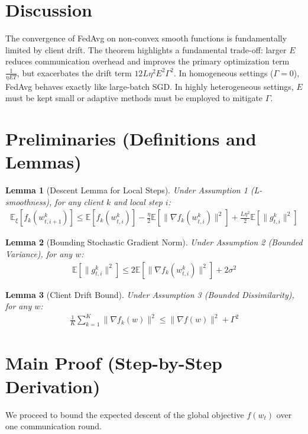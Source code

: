 \documentclass{article}
\newtheorem{lemma}{Lemma}
\begin{document}
\section*{Discussion}
The convergence of FedAvg on non-convex smooth functions is fundamentally limited by client drift. The theorem highlights a fundamental trade-off: larger $E$ reduces communication overhead and improves the primary optimization term $\frac{1}{\eta E T}$, but exacerbates the drift term $12 L \eta^2 E^2 \Gamma^2$. In homogeneous settings ($\Gamma=0$), FedAvg behaves exactly like large-batch SGD. In highly heterogeneous settings, $E$ must be kept small or adaptive methods must be employed to mitigate $\Gamma$.

\section*{Preliminaries (Definitions and Lemmas)}
\begin{lemma}[Descent Lemma for Local Steps]
Under Assumption 1 (L-smoothness), for any client $k$ and local step $i$:
\begin{align*}
\mathbb{E}_{\xi}[f_k(w_{t,i+1}^k)] \leq \mathbb{E}[f_k(w_{t,i}^k)] - \frac{\eta}{2} \mathbb{E}[\|\nabla f_k(w_{t,i}^k)\|^2] + \frac{L \eta^2}{2} \mathbb{E}[\|g_{t,i}^k\|^2]
\end{align*}
\end{lemma}

\begin{lemma}[Bounding Stochastic Gradient Norm]
Under Assumption 2 (Bounded Variance), for any $w$:
\begin{align*}
\mathbb{E}[\|g_{t,i}^k\|^2] \leq 2 \mathbb{E}[\|\nabla f_k(w_{t,i}^k)\|^2] + 2\sigma^2
\end{align*}
\end{lemma}

\begin{lemma}[Client Drift Bound]
Under Assumption 3 (Bounded Dissimilarity), for any $w$:
\begin{align*}
\frac{1}{K} \sum_{k=1}^K \|\nabla f_k(w)\|^2 \leq \|\nabla f(w)\|^2 + \Gamma^2
\end{align*}
\end{lemma}

\section*{Main Proof (Step-by-Step Derivation)}
We proceed to bound the expected descent of the global objective $f(w_t)$ over one communication round.
\end{document}

